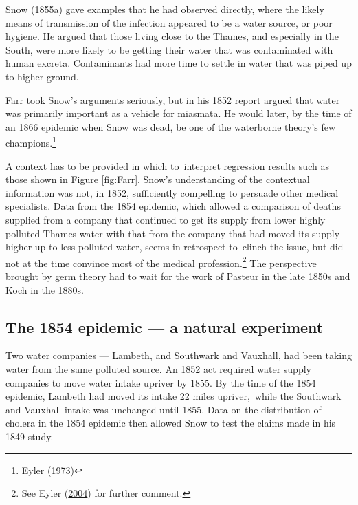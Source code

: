 \documentclass[
  10pt,
  b5paper]{book}
\begin{document}
Snow (\protect\hyperlink{ref-snow1849mode}{1855a}) gave examples that he had observed directly,
where the likely means of transmission of the infection
appeared to be a water source, or poor hygiene. He argued
that those living close to the Thames, and especially in
the South, were more likely to be getting their water
that was contaminated with human excreta. Contaminants had
more time to settle in water that was piped up to higher
ground.

Farr took Snow's arguments seriously, but in his 1852 report
argued that water was primarily important as a vehicle for
miasmata. He would later, by the time of an 1866 epidemic
when Snow was dead, be one of the waterborne theory's few
champions.\footnote{Eyler (\protect\hyperlink{ref-eyler1973william}{1973})}

A context has to be provided in which to~interpret regression
results such as those shown in Figure \ref{fig:Farr}.
Snow's understanding of the contextual information was not,
in 1852, sufficiently compelling to persuade other medical
specialists. Data from the 1854 epidemic, which allowed a
comparison of deaths supplied from a company that continued
to get its supply from lower highly polluted Thames water
with that from the company that had moved its supply higher
up to less polluted water, seems in retrospect to~clinch
the issue, but did not at the time convince most of the
medical profession.\footnote{See Eyler (\protect\hyperlink{ref-eyler2004changing}{2004}) for further comment.}
The perspective brought by germ theory had to
wait for the work of Pasteur in the late 1850s and
Koch in the 1880s.

\hypertarget{the-1854-epidemic-a-natural-experiment}{%
\subsection*{The 1854 epidemic --- a natural experiment}\label{the-1854-epidemic-a-natural-experiment}}

Two water companies --- Lambeth, and Southwark and Vauxhall,
had been taking water from the same polluted source. An 1852
act required water supply companies to move water intake
upriver by 1855. By the time of the 1854 epidemic, Lambeth
had moved its intake 22 miles upriver,~while the Southwark
and Vauxhall intake was unchanged until 1855. Data on the
distribution of cholera in the 1854 epidemic then allowed
Snow to test the claims made in his 1849 study.
\end{document}
